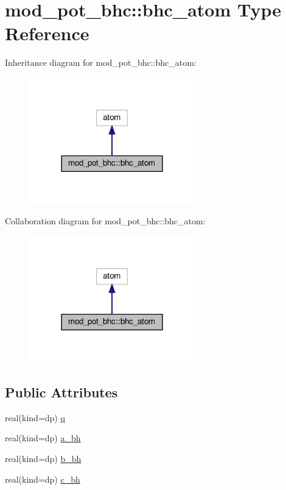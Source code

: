 \hypertarget{structmod__pot__bhc_1_1bhc__atom}{}\section{mod\+\_\+pot\+\_\+bhc\+:\+:bhc\+\_\+atom Type Reference}
\label{structmod__pot__bhc_1_1bhc__atom}


Inheritance diagram for mod\+\_\+pot\+\_\+bhc\+:\+:bhc\+\_\+atom\+:
\nopagebreak
\begin{figure}[H]
\begin{center}
\leavevmode
\includegraphics[width=204pt]{structmod__pot__bhc_1_1bhc__atom__inherit__graph}
\end{center}
\end{figure}


Collaboration diagram for mod\+\_\+pot\+\_\+bhc\+:\+:bhc\+\_\+atom\+:
\nopagebreak
\begin{figure}[H]
\begin{center}
\leavevmode
\includegraphics[width=204pt]{structmod__pot__bhc_1_1bhc__atom__coll__graph}
\end{center}
\end{figure}
\subsection*{Public Attributes}
\begin{DoxyCompactItemize}
\item 
real(kind=dp) \hyperlink{structmod__pot__bhc_1_1bhc__atom_af654cd806c3f5175cd87c6ebb1cf6181}{q}
\item 
real(kind=dp) \hyperlink{structmod__pot__bhc_1_1bhc__atom_a104ca48fcb8a03051cfd406b03f5b4b8}{a\+\_\+bh}
\item 
real(kind=dp) \hyperlink{structmod__pot__bhc_1_1bhc__atom_ac6bebcb8c7e357a51d366b1079b66fe3}{b\+\_\+bh}
\item 
real(kind=dp) \hyperlink{structmod__pot__bhc_1_1bhc__atom_a017789354a17ad408f9280f6d3ab8c61}{c\+\_\+bh}
\end{DoxyCompactItemize}


